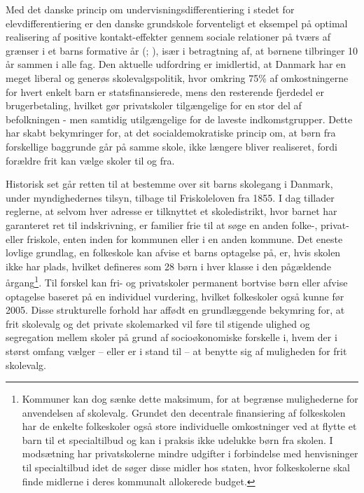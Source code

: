 \documentclass[
]{book}
\begin{document}
Med det danske princip om undervisningsdifferentiering i stedet for elevdifferentiering er den danske grundskole forventeligt et eksempel på optimal realisering af positive kontakt-effekter gennem sociale relationer på tværs af grænser i et barns formative år (; ), især i betragtning af, at børnene tilbringer 10 år sammen i alle fag. Den aktuelle udfordring er imidlertid, at Danmark har en meget liberal og generøs skolevalgspolitik, hvor omkring 75\% af omkostningerne for hvert enkelt barn er statsfinansierede, mens den resterende fjerdedel er brugerbetaling, hvilket gør privatskoler tilgængelige for en stor del af befolkningen - men samtidig utilgængelige for de laveste indkomstgrupper. Dette har skabt bekymringer for, at det socialdemokratiske princip om, at børn fra forskellige baggrunde går på samme skole, ikke længere bliver realiseret, fordi forældre frit kan vælge skoler til og fra.

Historisk set går retten til at bestemme over sit barns skolegang i Danmark, under myndighedernes tilsyn, tilbage til Friskoleloven fra 1855. I dag tillader reglerne, at selvom hver adresse er tilknyttet et skoledistrikt, hvor barnet har garanteret ret til indskrivning, er familier frie til at søge en anden folke-, privat- eller friskole, enten inden for kommunen eller i en anden kommune. Det eneste lovlige grundlag, en folkeskole kan afvise et barns optagelse på, er, hvis skolen ikke har plads, hvilket defineres som 28 børn i hver klasse i den pågældende årgang\footnote{Kommuner kan dog sænke dette maksimum, for at begrænse mulighederne for anvendelsen af skolevalg. Grundet den decentrale finansiering af folkeskolen har de enkelte folkeskoler også store individuelle omkostninger ved at flytte et barn til et specialtilbud og kan i praksis ikke udelukke børn fra skolen. I modsætning har privatskolerne mindre udgifter i forbindelse med henvisninger til specialtilbud idet de søger disse midler hos staten, hvor folkeskolerne skal finde midlerne i deres kommunalt allokerede budget.}. Til forskel kan fri- og privatskoler permanent bortvise børn eller afvise optagelse baseret på en individuel vurdering, hvilket folkeskoler også kunne før 2005. Disse strukturelle forhold har affødt en grundlæggende bekymring for, at frit skolevalg og det private skolemarked vil føre til stigende ulighed og segregation mellem skoler på grund af socioøkonomiske forskelle i, hvem der i størst omfang vælger -- eller er i stand til -- at benytte sig af muligheden for frit skolevalg.
\end{document}
